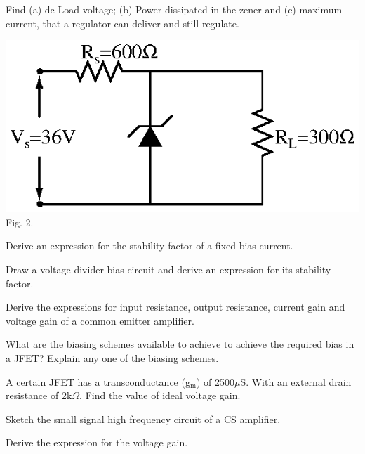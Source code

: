  Find (a) dc Load voltage; (b) Power dissipated in the zener and (c) maximum current,
  that a regulator can deliver and still regulate.

\begin{center}
\includegraphics{src/s3/ai/09_303/fig002}\\
Fig. 2.
\end{center}

\ene\ene

\item \iitem \iitem Derive an expression for the stability factor of a fixed bias current. 
\item Draw a voltage divider bias circuit and derive an expression for its stability factor.

\ene
\Or
\item Derive the expressions for input resistance, output resistance, current gain and voltage gain
  of a common emitter amplifier.
\ene

\item \iitem \iitem What are the biasing schemes available to achieve to achieve the required bias in a 
  JFET? Explain any one of the biasing schemes. 
\item A certain JFET has a transconductance (g$_\text{m}$) of 2500$\mu$S. With an external drain
  resistance of 2k$\Omega$. Find the value of ideal voltage gain. 
\ene
\Or
\item \iitem Sketch the small signal high frequency circuit of a CS amplifier.
\item Derive the expression for the voltage gain.
\ene\ene

\markC
\ene

